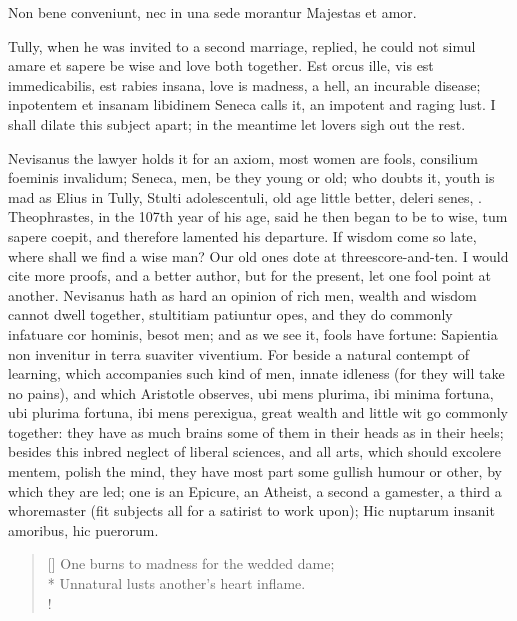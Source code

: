 {Non bene conveniunt, nec in una sede morantur
Majestas et amor.

Tully, when he was invited to a second marriage, replied, he could not
simul amare et sapere be wise and love both together. Est orcus
ille, vis est immedicabilis, est rabies insana, love is madness, a
hell, an incurable disease; inpotentem et insanam libidinem Seneca
calls it, an impotent and raging lust. I shall dilate this subject
apart; in the meantime let lovers sigh out the rest.

Nevisanus the lawyer holds it for an axiom, most women are fools,
consilium foeminis invalidum; Seneca, men, be they young or old;
who doubts it, youth is mad as Elius in Tully, Stulti adolescentuli,
old age little better, deleri senes, \etc{}. Theophrastes, in the 107th
year of his age, said he then began to be to wise, tum sapere
coepit, and therefore lamented his departure. If wisdom come so late,
where shall we find a wise man? Our old ones dote at
threescore-and-ten. I would cite more proofs, and a better author, but
for the present, let one fool point at another. Nevisanus hath as
hard an opinion of rich men, wealth and wisdom cannot dwell
together, stultitiam patiuntur opes, and they do commonly
infatuare cor hominis, besot men; and as we see it, fools have
fortune: Sapientia non invenitur in terra suaviter viventium. For
beside a natural contempt of learning, which accompanies such kind of
men, innate idleness (for they will take no pains), and which
Aristotle observes, ubi mens plurima, ibi minima fortuna, ubi
plurima fortuna, ibi mens perexigua, great wealth and little wit go
commonly together: they have as much brains some of them in their heads
as in their heels; besides this inbred neglect of liberal sciences, and
all arts, which should excolere mentem, polish the mind, they have most
part some gullish humour or other, by which they are led; one is an
Epicure, an Atheist, a second a gamester, a third a whoremaster (fit
subjects all for a satirist to work upon);
Hic nuptarum insanit amoribus, hic puerorum.

\settowidth{\versewidth}{One burns to madness for the wedded dame;}
\begin{verse}[\versewidth]
One burns to madness for the wedded dame;\\*
Unnatural lusts another's heart inflame.\\!
\end{verse}

}
